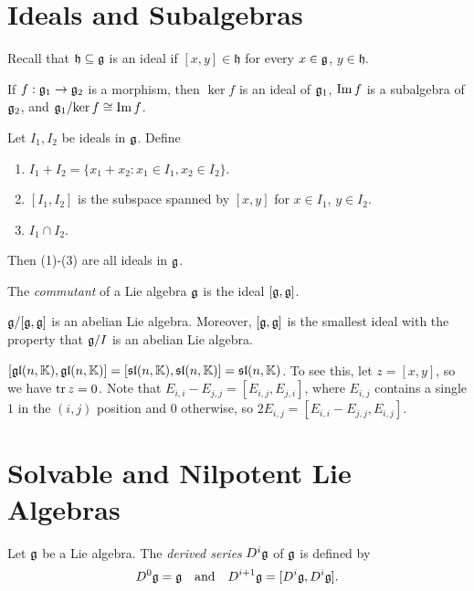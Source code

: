 \section{Ideals and Subalgebras}
\begin{remark}
  Recall that $\mathfrak{h} \subseteq \mathfrak{g}$
  is an ideal if $[x, y] \in \mathfrak{h}$
  for every $x \in \mathfrak{g}$, $y \in \mathfrak{h}$.
\end{remark}

\begin{lemma}
  If $f : \mathfrak{g}_1 \to \mathfrak{g}_2$ is a morphism,
  then $\ker f$ is an ideal of $\mathfrak{g}_1$,
  $\operatorname{Im} f$ is a subalgebra of $\mathfrak{g}_2$,
  and $\mathfrak{g}_1 / {\ker f} \cong \operatorname{Im} f$.
\end{lemma}

\begin{lemma}
  Let $I_1, I_2$ be ideals in $\mathfrak{g}$. Define
  \begin{enumerate}
    \item $I_1 + I_2 = \{x_1 + x_2 :
      x_1 \in I_1, x_2 \in I_2\}$.
    \item $[I_1, I_2]$ is the subspace
      spanned by $[x, y]$ for $x \in I_1$,
      $y \in I_2$.
      \item $I_1 \cap I_2$.
  \end{enumerate}
  Then (1)-(3) are all ideals in $\mathfrak{g}$.
\end{lemma}

\begin{definition}
  The \emph{commutant} of a Lie algebra
  $\mathfrak{g}$ is
  the ideal $[\mathfrak{g}, \mathfrak{g}]$.
\end{definition}

\begin{lemma}
  $\mathfrak{g} / [\mathfrak{g}, \mathfrak{g}]$ is an abelian Lie algebra.
  Moreover, $[\mathfrak{g}, \mathfrak{g}]$ is the smallest
  ideal with the property that $\mathfrak{g} / I$
  is an abelian Lie algebra.
\end{lemma}

\begin{example}
  $[\mathfrak{gl}(n, \mathbb{K}), \mathfrak{gl}(n, \mathbb{K})] = [\mathfrak{sl}(n, \mathbb{K}), \mathfrak{sl}(n, \mathbb{K})] = \mathfrak{sl}(n, \mathbb{K})$.
  To see this, let $z = [x, y]$, so
  we have $\operatorname{tr} z = 0$. Note that
  $E_{i, i} - E_{j, j} = [E_{i, j}, E_{j, i}]$,
  where $E_{i, j}$ contains a single
  $1$ in the $(i, j)$ position and $0$
  otherwise, so
  $2E_{i, j} = [E_{i, i} - E_{j, j}, E_{i, j}]$.
\end{example}

\section{Solvable and Nilpotent Lie Algebras}
\begin{definition}
  Let $\mathfrak{g}$ be a Lie algebra. The
  \emph{derived series} $D^i \mathfrak{g}$ of
  $\mathfrak{g}$ is defined by
  \[
    D^0 \mathfrak{g} = \mathfrak{g}
    \quad \text{and} \quad D^{i + 1} \mathfrak{g} = [D^i \mathfrak{g}, D^i \mathfrak{g}].
  \]
\end{definition}

